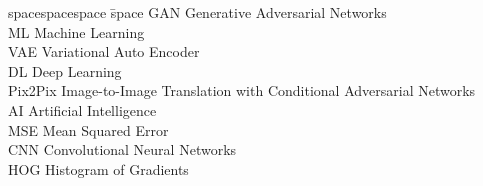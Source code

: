 
\begin{tabbing}
spacespacespace \= space \kill
GAN \> Generative Adversarial Networks \\
ML \> Machine Learning \\
VAE\> Variational Auto Encoder \\
DL \> Deep Learning \\
Pix2Pix \> Image-to-Image Translation with Conditional Adversarial Networks \\
AI \> Artificial Intelligence \\
MSE \> Mean Squared Error \\
CNN \> Convolutional Neural Networks \\
HOG  \> Histogram of Gradients \\
\end{tabbing}
\endinput
